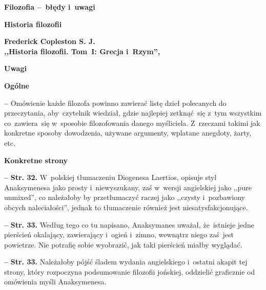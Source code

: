 \documentclass[a4paper,11pt]{article}
\newcommand{\spaceOne}{2em}
\newcommand{\spaceTwo}{1em}
\newcommand{\spaceThree}{0.25em}
\newcommand{\tb}{\textbf}
\newcommand{\noi}{\noindent}
\newcommand{\start}{\noi \tb{--} {}}
\newcommand{\Center}[1]{\begin{center} #1 \end{center}}
\newcommand{\CenterTB}[1]{\Center{\tb{#1}}}
\newcommand{\Str}[1]{\tb{Str. #1.}}
\newcommand{\Main}[1]{ \begin{center} {\LARGE \tb{#1} } \end{center} }
\newcommand{\Field}[1]{ \begin{center} {\Large \tb{#1} } \end{center} }
\newcommand{\Work}[1]{ \begin{center} {\large \tb{#1}} \end{center} }
\begin{document}



\Main{Filozofia --~błędy i~uwagi}

\vspace{\spaceOne}



\Field{Historia filozofii}



\Work{
 Frederick Copleston S. J. \\
  ,,Historia filozofii. Tom~I: Grecja i~Rzym'', \cite{Cop04} }


\CenterTB{Uwagi}

\noi \tb{Ogólne}

\vspace{\spaceThree}

\start Omówienie każde filozofa powinno zawierać listę dzieł
polecanych do przeczytania, aby~czytelnik wiedział, gdzie najlepiej
zetknąć~się z~tym wszystkim co~zawiera~się w~sposobie filozofowania
danego myśliciela. Z~rzeczami takimi jak konkretne sposoby dowodzenia,
używane argumenty, wplatane anegdoty, żarty, etc.

\vspace{\spaceTwo}


\noi \tb{Konkretne strony}

\vspace{\spaceThree}

\start \Str{32} W~polskiej tłumaczeniu Diogenesa Laertios, opisuje
styl Anaksymenesa jako prosty i~niewyszukany, zaś w~wersji angielskiej
jako ,,pure unmixed'', co należałoby by przetłumaczyć raczej jako
,,czysty i~pozbawiony obcych naleciałości'', jednak to tłumaczenie
również jest niesatysfakcjonujące.

\vspace{\spaceThree}


\start \Str{33} Według tego co tu napisano, Anaksymanes uważał,
że~istnieje jedne pierścień okalający, zawierający i~ogień i~zimno,
wewnątrz niego zaś~jest powietrze. Nie potrafię sobie wyobrazić, jak
taki pierścień miałby wyglądać.

\vspace{\spaceThree}


\start \Str{33} Należałoby pójść śladem wydania angielskiego i~ostatni
akapit tej strony, który rozpoczyna podsumowanie filozofii jońskiej,
oddzielić graficznie od omówienia myśli Anaksymenesa.
\end{document}
